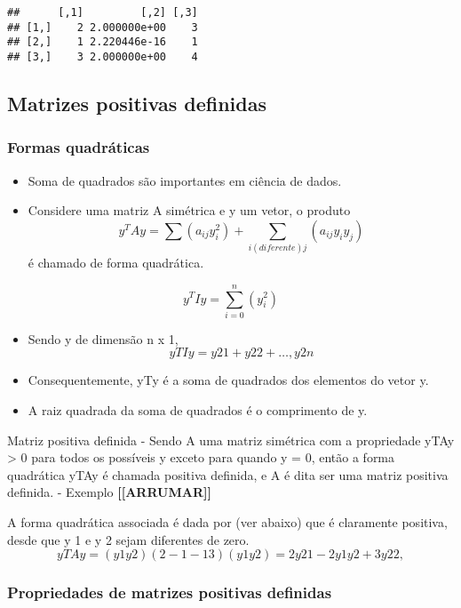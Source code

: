 \documentclass[
]{article}
\providecommand{\tightlist}{%
  \setlength{\itemsep}{0pt}\setlength{\parskip}{0pt}}
\begin{document}
\begin{verbatim}
##      [,1]         [,2] [,3]
## [1,]    2 2.000000e+00    3
## [2,]    1 2.220446e-16    1
## [3,]    3 2.000000e+00    4
\end{verbatim}

\hypertarget{matrizes-positivas-definidas}{%
\subsection{Matrizes positivas
definidas}\label{matrizes-positivas-definidas}}

\hypertarget{formas-quadruxe1ticas}{%
\subsubsection{Formas quadráticas}\label{formas-quadruxe1ticas}}

\begin{itemize}
\tightlist
\item
  Soma de quadrados são importantes em ciência de dados.
\item
  Considere uma matriz A simétrica e y um vetor, o produto \[
  y^{T}Ay = 
  \sum(a_{ij}y^{2}_{i}) + 
  \sum_{i (diferente) j}(a_{ij}y_{i}y_{j})
  \] é chamado de forma quadrática.
\end{itemize}

\[
y^{T}Iy = \sum^{n}_{i=0}(y^{2}_{i})
\]

\begin{itemize}
\item
  Sendo y de dimensão n x 1, \[
  yTIy = y 2
  1 + y 2
  2 + … , y 2
  n
  \]
\item
  Consequentemente, yTy é a soma de quadrados dos elementos do vetor y.
\item
  A raiz quadrada da soma de quadrados é o comprimento de y.
\end{itemize}

Matriz positiva definida - Sendo A uma matriz simétrica com a
propriedade yTAy \textgreater{} 0 para todos os possíveis y exceto para
quando y = 0, então a forma quadrática yTAy é chamada positiva definida,
e A é dita ser uma matriz positiva definida. - Exemplo
\textbf{{[}{[}ARRUMAR{]}{]}}

A forma quadrática associada é dada por (ver abaixo) que é claramente
positiva, desde que y 1 e y 2 sejam diferentes de zero. \[
yTAy = (y 1 y 2) ( 2 -1
-1 3 ) (y 1
y 2
) = 2y 2
1 - 2y 1y 2 + 3y 2
2 ,
\]

\hypertarget{propriedades-de-matrizes-positivas-definidas}{%
\subsubsection{Propriedades de matrizes positivas
definidas}\label{propriedades-de-matrizes-positivas-definidas}}
\end{document}
